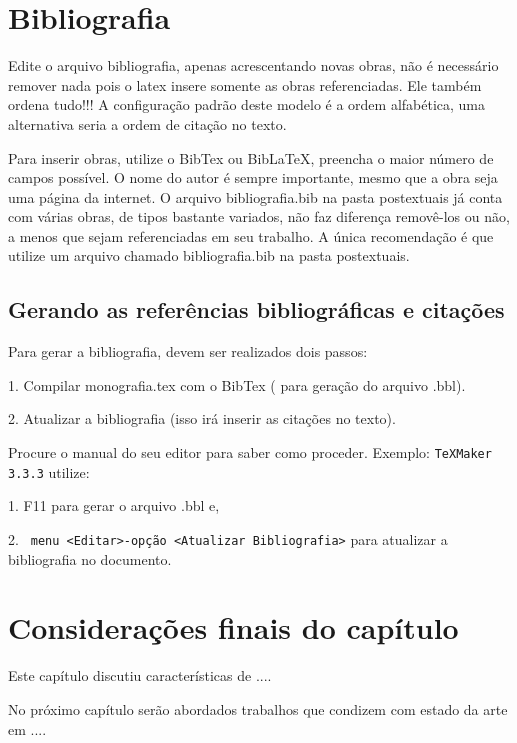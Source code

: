 \section{Bibliografia}

Edite o arquivo bibliografia, apenas acrescentando novas obras, não é necessário remover nada pois o latex insere somente as obras referenciadas. Ele também ordena tudo!!! A configuração padrão deste modelo é a ordem alfabética, uma alternativa seria a ordem de citação no texto.

Para inserir obras, utilize o BibTex ou BibLaTeX, preencha o maior número de campos possível.
O nome do autor é sempre importante, mesmo que a obra seja uma página da internet. O arquivo bibliografia.bib na pasta postextuais já conta com várias obras, de tipos bastante variados, não faz diferença removê-los ou não, a menos que sejam referenciadas em seu trabalho. 
A única recomendação é que utilize um arquivo chamado bibliografia.bib na pasta postextuais.
 
\subsection{Gerando as referências bibliográficas e citações}


Para gerar a bibliografia, devem ser realizados dois passos:

1. Compilar monografia.tex com o BibTex ( para geração do arquivo .bbl).

2. Atualizar a bibliografia (isso irá inserir as citações no texto).

Procure o manual do seu editor para saber como proceder. Exemplo: \verb+TeXMaker 3.3.3+
utilize:

1. F11 para gerar o arquivo .bbl e,

2. \verb+ menu <Editar>-opção <Atualizar Bibliografia>+ para atualizar a bibliografia no documento.




\section{Considerações finais do capítulo}

Este capítulo discutiu características de ....


No próximo capítulo serão abordados trabalhos que condizem com estado da arte em ....